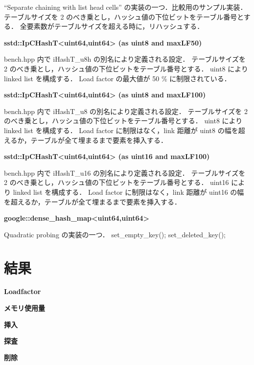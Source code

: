 ``Separate chaining with list head cells'' の実装の一つ．比較用のサンプル実装．
テーブルサイズを 2 のべき乗とし，ハッシュ値の下位ビットをテーブル番号とする．
全要素数がテーブルサイズを超える時に，リハッシュする．
\leavevmode \newline

%
{\bf sstd::IpCHashT<uint64,uint64> (as uint8 and maxLF50)}

{\rm bench.hpp} 内で {\rm iHashT\_u8h} の別名により定義される設定．
テーブルサイズを 2 のべき乗とし，ハッシュ値の下位ビットをテーブル番号とする．
uint8 により linked list を構成する．
Load factor の最大値が 50 \% に制限されている．
\leavevmode \newline

%
{\bf sstd::IpCHashT<uint64,uint64> (as uint8 and maxLF100)}

{\rm bench.hpp} 内で {\rm iHashT\_u8} の別名により定義される設定．
テーブルサイズを 2 のべき乗とし，ハッシュ値の下位ビットをテーブル番号とする．
uint8 により linked list を構成する．
Load factor に制限はなく，link 距離が uint8 の幅を超えるか，テーブルが全て埋まるまで要素を挿入する．
\leavevmode \newline

%
{\bf sstd::IpCHashT<uint64,uint64> (as uint16 and maxLF100)}

{\rm bench.hpp} 内で {\rm iHashT\_u16} の別名により定義される設定．
テーブルサイズを 2 のべき乗とし，ハッシュ値の下位ビットをテーブル番号とする．
uint16 により linked list を構成する．
Load factor に制限はなく，link 距離が uint16 の幅を超えるか，テーブルが全て埋まるまで要素を挿入する．
\leavevmode \newline

%
{\bf google::dense\_hash\_map<uint64,uint64>}

Quadratic probing の実装の一つ．
set\_empty\_key();
set\_deleted\_key();
\leavevmode \newline


\section{結果}

{\bf Loadfactor}

{\bf メモリ使用量}

{\bf 挿入}

{\bf 探査}

{\bf 削除}

